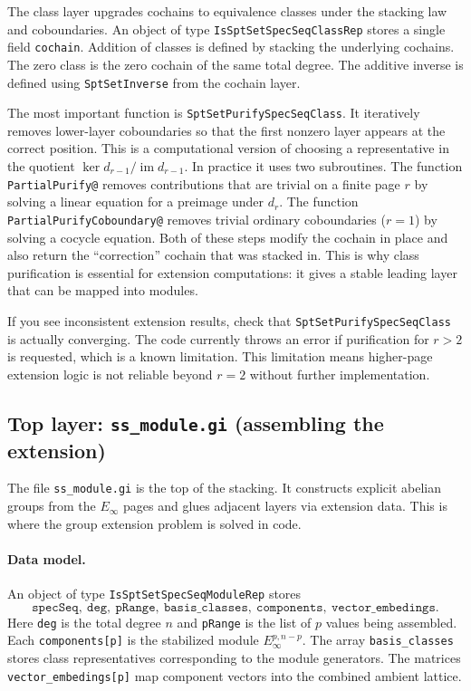 \documentclass{SciPost}
\begin{document}
The class layer upgrades cochains to equivalence classes under the stacking law and coboundaries.
An object of type \texttt{IsSptSetSpecSeqClassRep} stores a single field \texttt{cochain}.
Addition of classes is defined by stacking the underlying cochains.
The zero class is the zero cochain of the same total degree.
The additive inverse is defined using \texttt{SptSetInverse} from the cochain layer.

The most important function is \texttt{SptSetPurifySpecSeqClass}.
It iteratively removes lower-layer coboundaries so that the first nonzero layer appears at the correct position.
This is a computational version of choosing a representative in the quotient $\ker d_{r-1}/\operatorname{im} d_{r-1}$.
In practice it uses two subroutines.
The function \texttt{PartialPurify@} removes contributions that are trivial on a finite page $r$ by solving a linear equation for a preimage under $d_r$.
The function \texttt{PartialPurifyCoboundary@} removes trivial ordinary coboundaries ($r=1$) by solving a cocycle equation.
Both of these steps modify the cochain in place and also return the ``correction'' cochain that was stacked in.
This is why class purification is essential for extension computations: it gives a stable leading layer that can be mapped into modules.

If you see inconsistent extension results, check that \texttt{SptSetPurifySpecSeqClass} is actually converging.
The code currently throws an error if purification for $r>2$ is requested, which is a known limitation.
This limitation means higher-page extension logic is not reliable beyond $r=2$ without further implementation.

\subsection{Top layer: \texttt{ss\_module.gi} (assembling the extension)}

The file \texttt{ss\_module.gi} is the top of the stacking.
It constructs explicit abelian groups from the $E_\infty$ pages and glues adjacent layers via extension data.
This is where the group extension problem is solved in code.

\paragraph{Data model.}
An object of type \texttt{IsSptSetSpecSeqModuleRep} stores
\begin{equation}
\texttt{specSeq},\ \texttt{deg},\ \texttt{pRange},\ \texttt{basis\_classes},\ \texttt{components},\ \texttt{vector\_embedings}.
\end{equation}
Here \texttt{deg} is the total degree $n$ and \texttt{pRange} is the list of $p$ values being assembled.
Each \texttt{components[p]} is the stabilized module $E_\infty^{p,n-p}$.
The array \texttt{basis\_classes} stores class representatives corresponding to the module generators.
The matrices \texttt{vector\_embedings[p]} map component vectors into the combined ambient lattice.
\end{document}
